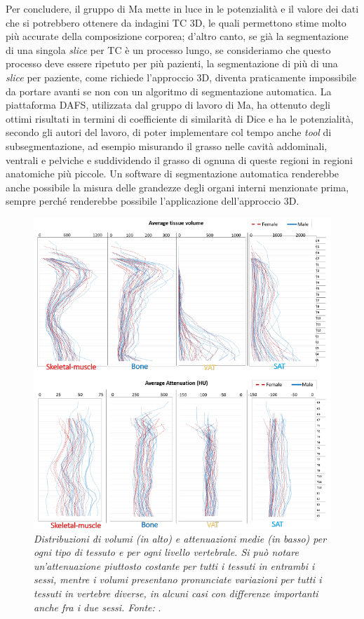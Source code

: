 Per concludere, il gruppo di Ma mette in luce in \cite{Ma2021} le potenzialità e il valore dei dati che si potrebbero ottenere da indagini TC 3D, le quali permettono stime molto più accurate della composizione corporea; d’altro canto, se già la segmentazione di una singola \textit{slice} per TC è un processo lungo, se consideriamo che questo processo deve essere ripetuto per più pazienti, la segmentazione di più di una \textit{slice} per paziente, come richiede l’approccio 3D, diventa praticamente impossibile da portare avanti se non con un algoritmo di segmentazione automatica. La piattaforma DAFS, utilizzata dal gruppo di lavoro di Ma, ha ottenuto degli ottimi risultati in termini di coefficiente di similarità di Dice e ha le potenzialità, secondo gli autori del lavoro, di poter implementare col tempo anche \textit{tool} di subsegmentazione, ad esempio misurando il grasso nelle cavità addominali, ventrali e pelviche e suddividendo il grasso di ognuna di queste regioni in regioni anatomiche più piccole. Un software di segmentazione automatica renderebbe anche possibile la misura delle grandezze degli organi interni menzionate prima, sempre perché renderebbe possibile l’applicazione dell'approccio 3D.
\begin{figure}[htp]
\centering
\includegraphics[scale=1.12]{Immagini/ma_vertebre.png}
\caption{\label{fig:ma_vertebre} \textit{Distribuzioni di volumi (in alto) e attenuazioni medie (in basso) per ogni tipo di tessuto e per ogni livello vertebrale. Si può notare un'attenuazione piuttosto costante per tutti i tessuti in entrambi i sessi, mentre i volumi presentano pronunciate variazioni per tutti i tessuti in vertebre diverse, in alcuni casi con differenze importanti anche fra i due sessi. Fonte:} \cite{Ma2021}.}
\end{figure}